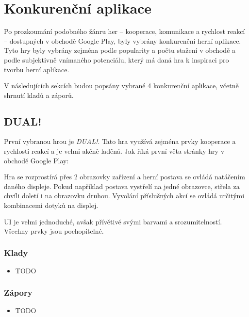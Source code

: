 \chapter{Konkurenční aplikace}

Po prozkoumání podobného žánru her
– kooperace, komunikace a rychlost reakcí –
dostupných v obchodě Google Play,
byly vybrány konkurenční herní aplikace.
Tyto hry byly vybrány zejména podle popularity a počtu stažení v obchodě
a podle subjektivně vnímaného potenciálu,
který má daná hra k inspiraci pro tvorbu herní aplikace.

V následujících sekcích budou popsány vybrané 4 konkurenční aplikace,
včetně shrnutí kladů a záporů.

\section{DUAL!}

První vybranou hrou je \emph{DUAL!}.
Tato hra využívá zejména prvky kooperace a rychlosti reakcí
a je velmi akčně laděná.
Jak říká první věta stránky hry \cite{seabaa_dual} v obchodě Google Play:

Hra se rozprostírá přes 2 obrazovky zařízení a herní postava se ovládá natáčením
daného displeje.
Pokud například postava vystřelí na jedné obrazovce,
střela za chvíli doletí i na obrazovku druhou.
Vyvolání příslušných akcí se ovládá určitými kombinacemi dotyků na displej.

UI je velmi jednoduché, avšak přívětivé svými barvami a srozumitelností.
Všechny prvky jsou pochopitelné.

\FloatBarrier

\subsection*{Klady}

\begin{itemize}
    \item TODO
\end{itemize}

\subsection*{Zápory}

\begin{itemize}
    \item TODO
\end{itemize}

